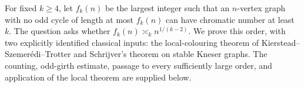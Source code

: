 For fixed \(k\geq4\), let \(f_k(n)\) be the largest integer such that an \(n\)-vertex graph with no odd cycle of length at most \(f_k(n)\) can have chromatic number at least \(k\). The question asks whether \(f_k(n)\asymp_k n^{1/(k-2)}\).
We prove this order, with two explicitly identified classical inputs: the local-colouring theorem of Kierstead--Szemer\'edi--Trotter and Schrijver's theorem on stable Kneser graphs. The counting, odd-girth estimate, passage to every sufficiently large order, and application of the local theorem are supplied below.
